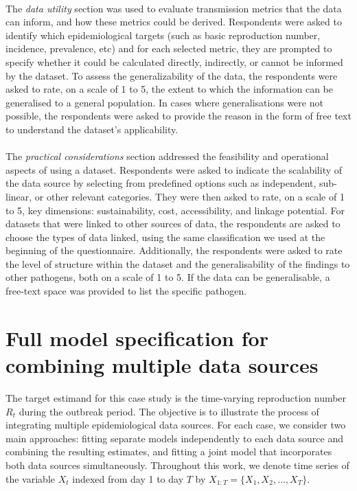 \documentclass{article}
\begin{document}
\paragraph{} The \textit{data utility} section was used to evaluate transmission metrics that the data can inform, and how these metrics could be derived. Respondents were asked to identify which epidemiological targets (such as basic reproduction number, incidence, prevalence, etc) and for each selected metric, they are prompted to specify whether it could be calculated directly, indirectly, or cannot be informed by the dataset. To assess the generalizability of the data, the respondents were asked to rate, on a scale of 1 to 5, the extent to which the information can be generalised to a general population. In cases where generalisations were not possible, the respondents were asked to provide the reason in the form of free text to understand the dataset's applicability. 

\paragraph{}The \textit{practical considerations} section addressed the feasibility and operational aspects of using a dataset. Respondents were asked to indicate the scalability of the data source by selecting from predefined options such as independent, sub-linear, or other relevant categories. They were then asked to rate, on a scale of 1 to 5, key dimensions: sustainability, cost, accessibility, and linkage potential. For datasets that were linked to other sources of data, the respondents are asked to choose the types of data linked, using the same classification we used at the beginning of the questionnaire.  Additionally, the respondents were asked to rate the level of structure within the dataset and the generalisability of the findings to other pathogens, both on a scale of 1 to 5. If the data can be generalisable, a free-text space was provided to list the specific pathogen. 




\section{Full model specification for combining multiple data sources}
The target estimand for this case study is the time-varying reproduction number $R_t$ during the outbreak period. The objective is to illustrate the process of integrating multiple epidemiological data sources. For each case, we consider two main approaches: fitting separate models independently to each data source and combining the resulting estimates, and fitting a joint model that incorporates both data sources simultaneously. Throughout this work, we denote time series of the variable $X_t$ indexed from day 1 to day $T$ by $X_{1:T} = \{X_1, X_2, \ldots, X_T\}$.
\end{document}
